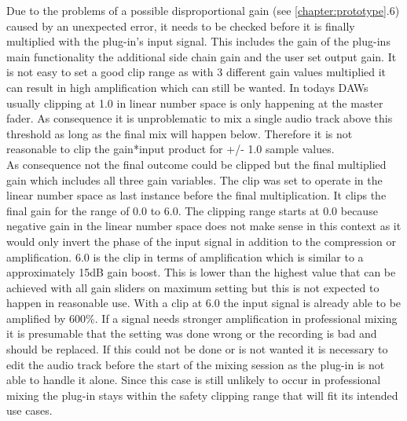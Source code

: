 Due to the problems of a possible disproportional gain (see \ref{chapter:prototype}.6) caused by an unexpected error, it needs to be checked before it is finally multiplied with the plug-in’s input signal. This includes the gain of the plug-ins main functionality the additional side chain gain and the user set output gain. It is not easy to set a good clip range as with 3 different gain values multiplied it can result in high amplification which can still be wanted. In todays DAWs usually clipping at 1.0 in linear number space is only happening at the master fader. As consequence it is unproblematic to mix a single audio track above this threshold as long as the final mix will happen below. Therefore it is not reasonable to clip the gain*input product for +/- 1.0 sample values.\\
As consequence not the final outcome could be clipped but the final multiplied gain which includes all three gain variables. The clip was set to operate in the linear number space as last instance before the final multiplication. It clips the final gain for the range of 0.0 to 6.0. The clipping range starts at 0.0 because negative gain in the linear number space does not make sense in this context as it would only invert the phase of the input signal in addition to the compression or amplification. 6.0 is the clip in terms of amplification which is similar to a approximately 15dB gain boost. This is lower than the highest value that can be achieved with all gain sliders on maximum setting but this is not expected to happen in reasonable use. With a clip at 6.0 the input signal is already able to be amplified by 600\%. If a signal needs stronger amplification in professional mixing it is presumable that the setting was done wrong or the recording is bad and should be replaced. If this could not be done or is not wanted it is necessary to edit the audio track before the start of the mixing session as the plug-in is not able to handle it alone. Since this case is still unlikely to occur in professional mixing the plug-in stays within the safety clipping range that will fit its intended use cases.\\